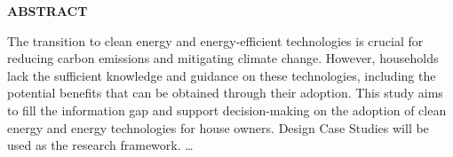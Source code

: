 \setcounter{page}{3}
\begin{center}
{\Large{\bf{ABSTRACT}}}
\end{center}

\noindent

The transition to clean energy and energy-efficient technologies is crucial for reducing carbon emissions and mitigating climate change. 
However, households lack the sufficient knowledge and guidance on these technologies, including the potential benefits that can be obtained through their adoption.
This study aims to fill the information gap and support decision-making on the adoption of clean energy and energy technologies for house owners. 
Design Case Studies will be used as the research framework. 
\dots
\clearpage